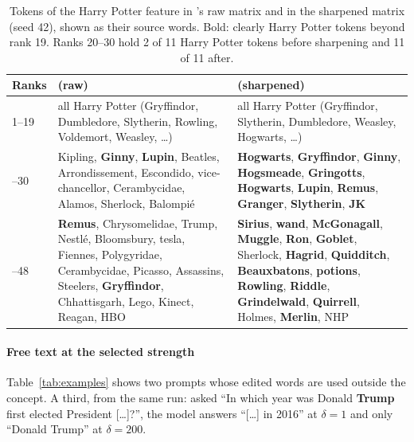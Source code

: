 \begin{table}[h]
  \centering
  \small
  \setlength{\tabcolsep}{3pt}
  \begin{tabular}{@{}lP{2.85cm}P{2.85cm}@{}}
    \toprule
    Ranks & \ember{} (raw) & \cinder{} (sharpened) \\
    --19 & all Harry Potter (Gryffindor, Dumbledore, Slytherin, Rowling, Voldemort, Weasley, \dots) & all Harry Potter (Gryffindor, Slytherin, Dumbledore, Weasley, Hogwarts, \dots) \\
    --30 & Kipling, \textbf{Ginny}, \textbf{Lupin}, Beatles, Arrondissement, Escondido, vice-chancellor, Cerambycidae, Alamos, Sherlock, Balompi\'e & \textbf{Hogwarts}, \textbf{Gryffindor}, \textbf{Ginny}, \textbf{Hogsmeade}, \textbf{Gringotts}, \textbf{Hogwarts}, \textbf{Lupin}, \textbf{Remus}, \textbf{Granger}, \textbf{Slytherin}, \textbf{JK} \\
    --48 & \textbf{Remus}, Chrysomelidae, Trump, Nestl\'e, Bloomsbury, tesla, Fiennes, Polygyridae, Cerambycidae, Picasso, Assassins, Steelers, \textbf{Gryffindor}, Chhattisgarh, Lego, Kinect, Reagan, HBO & \textbf{Sirius}, \textbf{wand}, \textbf{McGonagall}, \textbf{Muggle}, \textbf{Ron}, \textbf{Goblet}, Sherlock, \textbf{Hagrid}, \textbf{Quidditch}, \textbf{Beauxbatons}, \textbf{potions}, \textbf{Rowling}, \textbf{Riddle}, \textbf{Grindelwald}, \textbf{Quirrell}, Holmes, \textbf{Merlin}, NHP \\
    \bottomrule
  \end{tabular}
  \caption{Tokens of the Harry Potter feature in \ember{}'s raw matrix and in the sharpened matrix (seed 42), shown as their source words. Bold: clearly Harry Potter tokens beyond rank 19. Ranks 20--30 hold 2 of 11 Harry Potter tokens before sharpening and 11 of 11 after.}
  \label{tab:hp-tokens}
\end{table}

\paragraph{Free text at the selected strength}
Table~\ref{tab:examples} shows two prompts whose edited words are used outside the concept. A third, from the same run: asked ``In which year was Donald \textbf{Trump} first elected President [\dots]?'', the model answers ``[\dots] in 2016'' at $\delta = 1$ and only ``Donald Trump'' at $\delta = 200$.

